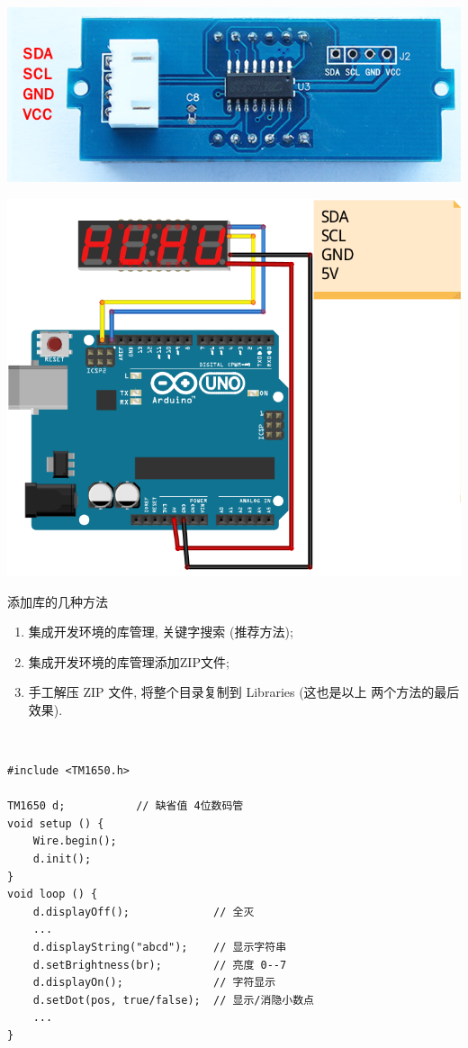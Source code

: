 \documentclass[a4paper,11pt]{seminar}
\begin{document}
\includegraphics[width=.53\textwidth]{led4_back}
\endslide

\centering
\includegraphics[width=.6\textwidth]{seg8_led}
\endslide

添加库的几种方法
\begin{enumerate}
    \item 集成开发环境的库管理, 关键字搜索 (推荐方法);
    \item 集成开发环境的库管理添加ZIP文件;
    \item 手工解压 ZIP 文件, 将整个目录复制到 Libraries (这也是以上
        两个方法的最后效果).
\end{enumerate}
\endslide

~\ \vskip-6mm
\begin{lstlisting}
#include <TM1650.h>

TM1650 d;           // 缺省值 4位数码管
void setup () {
    Wire.begin();
    d.init();
}
void loop () {
    d.displayOff();             // 全灭
    ...
    d.displayString("abcd");    // 显示字符串
    d.setBrightness(br);        // 亮度 0--7
    d.displayOn();              // 字符显示
    d.setDot(pos, true/false);  // 显示/消隐小数点
    ...
}
\end{lstlisting}
\endslide
\end{document}
